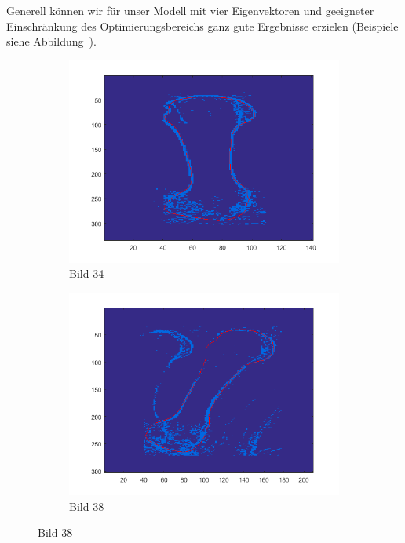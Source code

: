 \documentclass[]{report}
\begin{document}
\begin{enumerate}
\begin{enumerate}
				Generell können wir für unser Modell mit vier Eigenvektoren und geeigneter Einschränkung des Optimierungsbereichs ganz gute Ergebnisse erzielen (Beispiele siehe Abbildung~). 
				\begin{figure}
					\begin{subfigure}[t]{0.3\textwidth}
						\centering
						\includegraphics[width=\textwidth]{figures/image34_4EV_dist_3STD.png}
						\caption{Bild 34}
						\label{fig:image34_4EV_dist_3STD}
					\end{subfigure}
					\qquad
					\begin{subfigure}[t]{0.3\textwidth}
						\centering
						\includegraphics[width=\textwidth]{figures/image38_4EV_dist_3STD.png}
						\caption{Bild 38}

\end{subfigure}
\end{figure}
\end{enumerate}
\end{enumerate}
\end{document}
